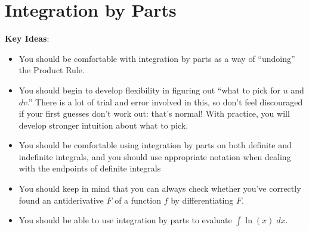 \documentclass[main]{subfiles}
\begin{document}
\ifSubfilesClassLoaded{%
  \chaptermark{\chaptersix}
}{}

\section{Integration by Parts} \label{ws6-3}

\begin{problemonly}
    \begin{framed}

\textbf{Key Ideas}:

\begin{itemize}[topsep=0pt,partopsep=0pt,parsep=8pt,itemsep=0pt]


  \item You should be comfortable with integration by parts as a
  way of ``undoing'' the Product Rule.

\item You should begin to develop flexibility in figuring out ``what to
  pick for $u$ and $dv$.''  There is a lot of trial and error involved in this,
  so don't feel discouraged if your first guesses don't work out: that's
  normal!  With practice, you will develop stronger intuition about what
  to pick.

\item You should be comfortable using integration by parts on
  both definite and indefinite integrals, and you should use appropriate notation when dealing with the endpoints of definite integrals

  \item You should keep in mind that you can always check whether you've correctly found an antiderivative $F$ of a function $f$ by differentiating $F$.

  \item You should be able to use integration by parts to evaluate $\displaystyle \int \ln(x)\;dx$. 


\end{itemize}
\end{framed}
\end{problemonly}
\end{document}
